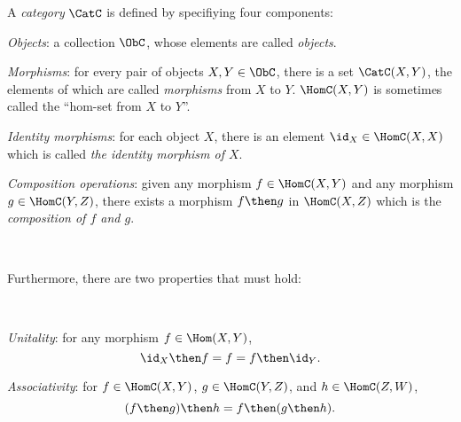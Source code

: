\begin{shaded}
\begin{definition}[Category] \label{def:categorymain}
A \emph{category} $\CatC$ is defined by specifiying four components: 
\begin{compactenum}
\item \emph{Objects}: a collection $\ObC$, whose elements are called \emph{objects}.
\item \emph{Morphisms}: for every pair of objects $X, Y\in \ObC$, there is a set $\CatC(X, Y)$, the elements of which are called
\emph{morphisms} from $X$ to $Y$. $\HomC(X, Y)$ is sometimes called the ``hom-set from $X$ to $Y$''. 
\item \emph{Identity morphisms}:  for each object $X$, there is
an element $\id_X \in \HomC(X,X) $ which is called \emph{the identity
morphism of $X$}.
\item \emph{Composition operations}: given any morphism $f \in  \HomC(X,Y) $ and any morphism $g \in \HomC(Y, Z)$, there exists a morphism $f\then g$ in $\HomC(X, Z)$ which is the \emph{composition of $f$ and $g$}.
\end{compactenum}

\

Furthermore, there are two properties that must hold:

\

\begin{compactenum}
    \item \emph{Unitality}: for any morphism $f\in\Hom(X,Y)$, 
    \begin{equation}
        \id_X \then f= f = f \then \id_Y.
    \end{equation}
    \item \emph{Associativity}: for $f\in \HomC(X,Y)$, $g\in \HomC(Y,Z)$, and $h\in \HomC(Z,W)$,
    \begin{equation}
        (f\then g)\then h= f \then (g \then h).
    \end{equation}
\end{compactenum}

\end{definition}
\end{shaded}

